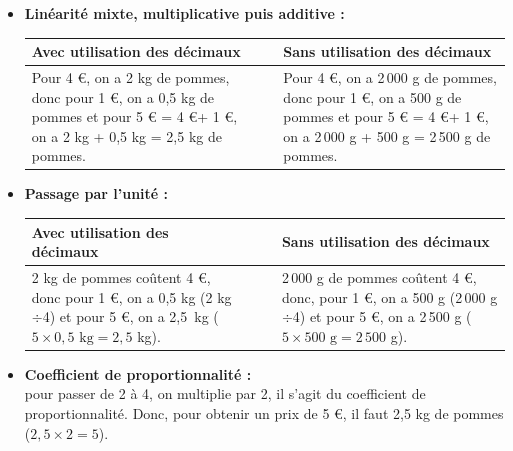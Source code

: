 \begin{corrige}
   \begin{itemize}
       \item {\bf Linéarité mixte, multiplicative puis additive :} \\
          \begin{tabular}{p{7cm}c|cp{7.5cm}}
             Avec utilisation des décimaux
             & & &
             Sans utilisation des décimaux \\
             \hline
             Pour 4 \euro, on a 2 kg de pommes, donc pour 1 \euro, on a 0,5 kg de pommes et pour 5 \euro{} = 4 \euro + 1 \euro, on a 2 kg + 0,5 kg  = 2,5 kg de pommes.
             & & &
             Pour 4 \euro, on a 2\,000 g de pommes, donc pour 1 \euro, on a 500 g de pommes et pour 5 \euro{} = 4 \euro + 1 \euro, on a 2\,000 g + 500 g  = 2\,500 g de pommes.
          \end{tabular}
      \item {\bf Passage par l'unité :} \\
          \begin{tabular}{p{7cm}c|cp{7cm}}
             Avec utilisation des décimaux
             & & &
             Sans utilisation des décimaux \\
             \hline
             2 kg de pommes coûtent 4 \euro, donc pour 1 \euro, on a 0,5 kg (2 kg$\div$4) et pour 5 \euro, on a 2,5~kg ($5\times0,5\text{ kg} =2,5$ kg).
             & & &
             2\,000 g de pommes coûtent 4 \euro, donc, pour 1 \euro, on a 500 g (2\,000 g$\div$4) et pour 5 \euro, on a 2\,500 g ($5\times500\text{ g} =2\,500$ g).
      \end{tabular}
   \end{itemize}

\Coupe

   \begin{itemize}
      \item {\bf Coefficient de proportionnalité :} \\
   pour passer de 2 à 4, on multiplie par 2, il s'agit du coefficient de proportionnalité. Donc, pour obtenir un prix de 5 \euro, il faut 2,5 kg de pommes ($2,5\times2 =5$).
   \end{itemize}
\end{corrige}

\bigskip

